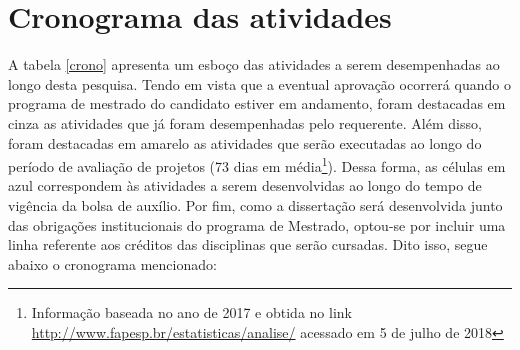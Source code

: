\section{Cronograma das atividades}\label{cronograma}

A tabela \ref{crono} apresenta um esboço das atividades a serem desempenhadas ao longo desta pesquisa. Tendo em vista que a eventual aprovação ocorrerá quando o programa de mestrado do candidato estiver em andamento, foram destacadas em cinza as atividades que já foram desempenhadas pelo requerente. Além disso, foram destacadas em amarelo as atividades que serão executadas ao longo do período de avaliação de projetos (73 dias em média\footnote{Informação baseada no ano de 2017 e obtida no link \url{http://www.fapesp.br/estatisticas/analise/} acessado em 5 de julho de 2018}). 
Dessa forma, as células em azul correspondem às atividades a serem desenvolvidas ao longo do tempo de vigência da bolsa de auxílio. Por fim, como a dissertação será desenvolvida junto das obrigações institucionais do programa de Mestrado, optou-se por incluir uma linha referente aos créditos das disciplinas que serão cursadas. 
Dito isso, segue abaixo o cronograma mencionado:

